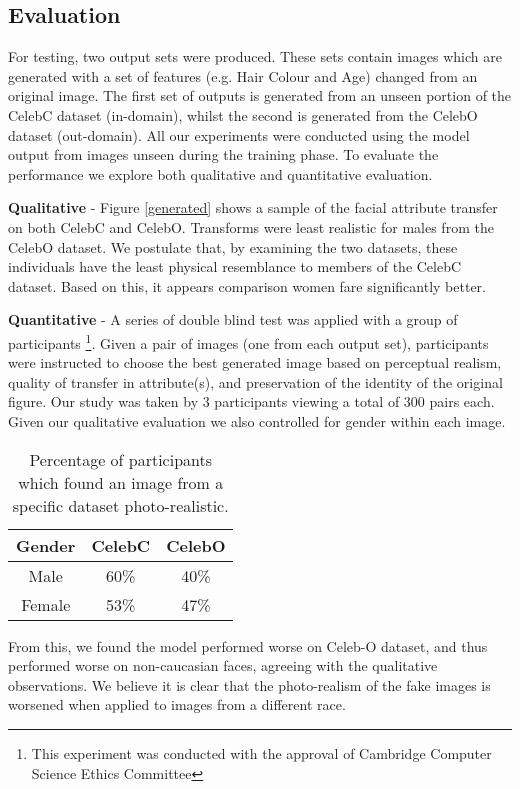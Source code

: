 \documentclass[10pt,twocolumn,letterpaper]{article}
\begin{document}
\subsection{Evaluation}

For testing, two output sets were produced. These sets contain images which are generated with a set of features (e.g. Hair Colour and Age) changed from an original image. The first set of outputs is generated from an unseen portion of the CelebC dataset (in-domain), whilst the second is generated from the CelebO dataset (out-domain). All our experiments were conducted using the model output from images unseen during the training phase. To evaluate the performance we explore both qualitative and quantitative evaluation.

\textbf{Qualitative} - Figure \ref{generated} shows a sample of the facial attribute transfer on both CelebC and CelebO. Transforms were least realistic for males from the CelebO dataset. We postulate that, by examining the two datasets, these individuals have the least physical resemblance to members of the CelebC dataset. Based on this, it appears comparison women fare significantly better.

\textbf{Quantitative} - A series of double blind test was applied with a group of participants \footnote{This experiment was conducted with the approval of Cambridge Computer Science Ethics Committee}. 
Given a pair of images (one from each output set), participants were instructed to choose the best generated
image based on perceptual realism, quality of transfer in attribute(s), and preservation of the identity of the original figure. Our study was taken by 3 participants viewing a total of 300 pairs each. Given our qualitative evaluation we also controlled for gender within each image.
\begin{table}[h!]
\begin{center}
\begin{tabular}{|c|c|c|}
\hline
Gender& CelebC & CelebO\\
\hline \hline
Male& 60\%& 40\% \\
Female &53\% & 47\%\\
\hline
\end{tabular}
\end{center}
\caption{Percentage of participants which found an image from a specific dataset photo-realistic.}
\end{table}

From this, we found the model performed worse on Celeb-O dataset, and thus performed worse on non-caucasian faces, agreeing with the qualitative observations. We believe it is clear that the photo-realism of the fake images is worsened when applied to images from a different race.
\end{document}
